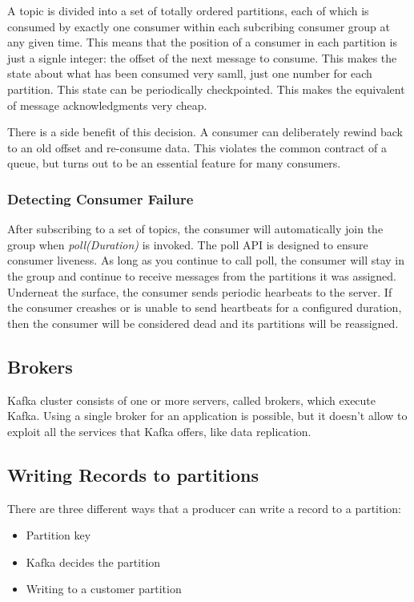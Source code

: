 A topic is divided into a set of totally ordered partitions, each of which is
consumed by exactly one consumer within each subcribing consumer group at any
given time.
This means that the position of a consumer in each partition is just a signle
integer: the offset of the next message to consume.
This makes the state about what has been consumed very samll, just one number
for each partition. This state can be periodically checkpointed. This makes the
equivalent of message acknowledgments very cheap.

There is a side benefit of this decision. A consumer can deliberately rewind
back to an old offset and re-consume data. This violates the common contract of
a queue, but turns out to be an essential feature for many consumers.

\subsubsection{Detecting Consumer Failure}

After subscribing to a set of topics, the consumer will automatically join the
group when \textit{poll(Duration)} is invoked.
The poll API is designed to ensure consumer liveness. As long as you continue
to call poll, the consumer will stay in the group and continue to receive
messages from the partitions it was assigned. Underneat the surface, the
consumer sends periodic hearbeats to the server. If the consumer creashes or is
unable to send heartbeats for a configured duration, then the consumer will be
considered dead and its partitions will be reassigned.

\subsection{Brokers}

Kafka cluster consists of one or more servers, called brokers, which execute
Kafka. Using a single broker for an application is possible, but it doesn't
allow to exploit all the services that Kafka offers, like data replication.

\subsection{Writing Records to partitions}

There are three different ways that a producer can write a record to a
partition:

\begin{itemize}
    \item   Partition key
    \item   Kafka decides the partition
    \item   Writing to a customer partition
\end{itemize}


